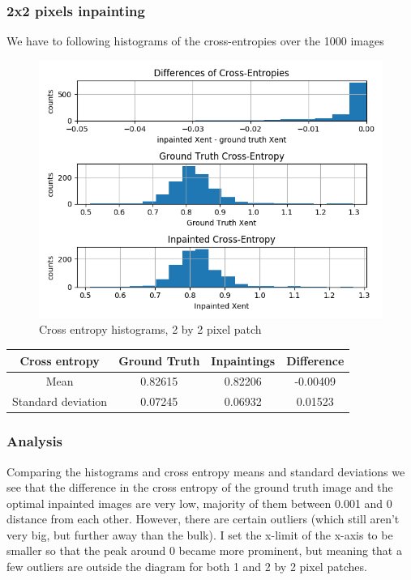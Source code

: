 \documentclass{article}
\begin{document}
\begin{enumerate}
    \subsubsection{2x2 pixels inpainting}

    We have to following histograms of the cross-entropies over the 1000 images

    \begin{figure}[H]
      \centering
      \includegraphics[width=1.0\textwidth]{task3/inpainting_2x2_hist.png}
      \caption{Cross entropy histograms, 2 by 2 pixel patch}
      \label{fig:Xent_hists_b2x2}
    \end{figure}

    \begin{center}
      \begin{tabular}{ |c|c|c|c| } 
        \hline
        Cross entropy & Ground Truth & Inpaintings & Difference \\
        \hline
        Mean & 0.82615 & 0.82206 & -0.00409 \\
        Standard deviation & 0.07245 & 0.06932 & 0.01523 \\
        \hline
      \end{tabular}
    \end{center}

    \subsubsection{Analysis}

    Comparing the histograms and cross entropy means and standard deviations we
    see that the difference in the cross entropy of the ground truth image and
    the optimal inpainted images are very low, majority of them between 0.001
    and 0 distance from each other. However, there are certain outliers (which
    still aren't very big, but further away than the bulk). I set the x-limit of
    the x-axis to be smaller so that the peak around 0 became more prominent,
    but meaning that a few outliers are outside the diagram for both 1 and 2 by
    2 pixel patches.


\end{enumerate}
\end{document}
